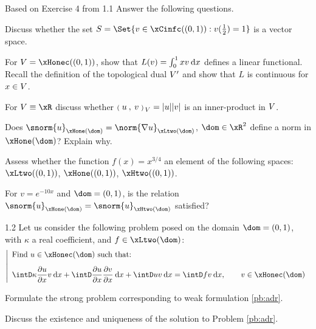 \begin{tmaxrcs}{Based on Exercise 4 from \cite{MIT}}{1.1}
Answer the following questions.

\begin{tmatsks}
\item Discuss whether the set $S = \Set{ v \in \xCinfc((0,1)) : v(\frac{1}{2}) = 1 }$ is a vector space.
\item For $\xV = \xHonec((0,1))$, show that $L(v) =\int_0^1 xv \hspace{.5ex}{\mathrm d} x$ defines a linear functional. Recall the definition of the topological dual ${V}'$ and show that $L$ is continuous for $x \in {V}$.
\item For $\xV \equiv \xR$ discuss whether ${{\scriptstyle\mathbf{(}}\;u\:,\: v \;{\scriptstyle\mathbf{)}}}_{\,{V}} = |u| |v|$ is an inner-product in ${V}$.
\item Does $\snorm{u}_{\xHone(\dom)} = \norm{\nabla u}_{\xLtwo(\dom)}$, $\dom\in\xR^2$ define a norm in $\xHone(\dom)$? Explain why.
\item Assess whether the function $f(x) = x^{3/4}$ an element of the following spaces: $\xLtwo((0,1))$, $\xHone((0,1))$, $\xHtwo((0,1))$.
\item For $v = e^{-10x}$ and $\dom = (0,1)$, is the relation $\snorm{u}_{\xHone(\dom)} = \snorm{u}_{\xHtwo(\dom)}$ satisfied?
\end{tmatsks}
\end{tmaxrcs}

\begin{tmaxrcs}{}{1.2}
Let us consider the following problem posed on the domain $\dom = (0, 1)$, with $\kappa$ a real coefficient, and $f\in\xLtwo(\dom)$:
\begin{equation}\label{pb:adr}
\left\lvert
\begin{array}{ll}
\mbox{Find $u \in \xHonec(\dom)$ such that:}\\[2ex]
\displaystyle \intD \kappa \pddx{u} v \dx + \intD \pddx{u} \pddx{v} \dx + \intD u v \dx = \intD f v \dx, \qquad v \in \xHonec(\dom)
\end{array}
\right .
\end{equation}
\begin{tmatsks}
\item Formulate the strong problem corresponding to weak formulation \eqref{pb:adr}.
\item Discuss the existence and uniqueness of the solution to Problem \eqref{pb:adr}.
\end{tmatsks}
\end{tmaxrcs}

